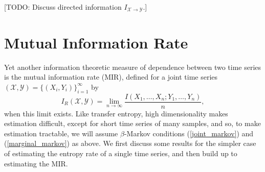 \documentclass{article} %
\newcommand{\X}{\mathcal{X}}                        %
\newcommand{\Y}{\mathcal{Y}}                        %
\begin{document}
[TODO: Discuss directed information $I_{\X \to \Y}$.]


\section{Mutual Information Rate}
\label{sec:MIR}
Yet another information theoretic measure of dependence between two time series
is the mutual information rate (MIR), defined for a joint time series
$(\X,\Y) = \{(X_i,Y_i)\}_{i = 1}^\infty$ by
\[I_R(\X,\Y)= \lim_{n \to \infty} \frac{I(X_1,\dots,X_n;Y_1,\dots,Y_n)}{n},\]
when this limit exists. Like transfer entropy, high dimensionality makes
estimation difficult, except for short time series of many samples, and so, to
make estimation tractable, we will assume $\beta$-Markov conditions
(\ref{joint_markov}) and (\ref{marginal_markov}) as above. We first discuss
some results for the simpler case of estimating the entropy rate of a single
time series, and then build up to estimating the MIR.
\end{document}
